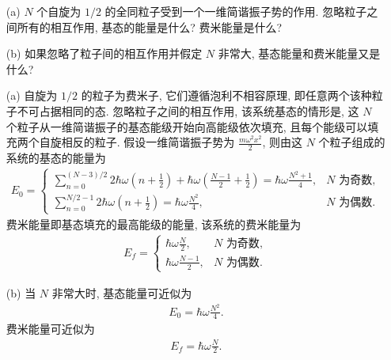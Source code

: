 \documentclass{assignment}
\begin{document}
\begin{prob}[课本习题 7.2]
    \begin{itemize}
        \item[(a)] $N$ 个自旋为 $1/2$ 的全同粒子受到一个一维简谐振子势的作用. 忽略粒子之间所有的相互作用, 基态的能量是什么? 费米能量是什么?
        \item[(b)] 如果忽略了粒子间的相互作用并假定 $N$ 非常大, 基态能量和费米能量又是什么?
    \end{itemize}
\end{prob}
\begin{sol}
    \begin{itemize}
        \item[(a)] 自旋为 $1/2$ 的粒子为费米子, 它们遵循泡利不相容原理, 即任意两个该种粒子不可占据相同的态. 忽略粒子之间的相互作用, 该系统基态的情形是, 这 $N$ 个粒子从一维简谐振子的基态能级开始向高能级依次填充, 且每个能级可以填充两个自旋相反的粒子. 假设一维简谐振子势为 $\frac{m\omega^2x^2}{2}$, 则由这 $N$ 个粒子组成的系统的基态的能量为
        \begin{align}
            E_0=\left\{\begin{array}{ll}
                \sum_{n=0}^{(N-3)/2}2\hbar\omega\left(n+\frac{1}{2}\right)+\hbar\omega\left(\frac{N-1}{2}+\frac{1}{2}\right)=\hbar\omega\frac{N^2+1}{4},&N\text{ 为奇数},\\
                \sum_{n=0}^{N/2-1}2\hbar\omega\left(n+\frac{1}{2}\right)=\hbar\omega\frac{N^2}{4},&N\text{ 为偶数}.
            \end{array}\right.
        \end{align}
        费米能量即基态填充的最高能级的能量, 该系统的费米能量为
        \begin{align}
            E_f=\left\{\begin{array}{ll}
                \hbar\omega\frac{N}{2},&N\text{ 为奇数},\\
                \hbar\omega\frac{N-1}{2},&N\text{ 为偶数}.
            \end{array}\right.
        \end{align}
        \item[(b)] 当 $N$ 非常大时, 基态能量可近似为
        \begin{align}
            E_0=\hbar\omega\frac{N^2}{4}.
        \end{align}
        费米能量可近似为
        \begin{align}
            E_f=\hbar\omega\frac{N}{2}.
        \end{align}
    \end{itemize}
\end{sol}
\end{document}
